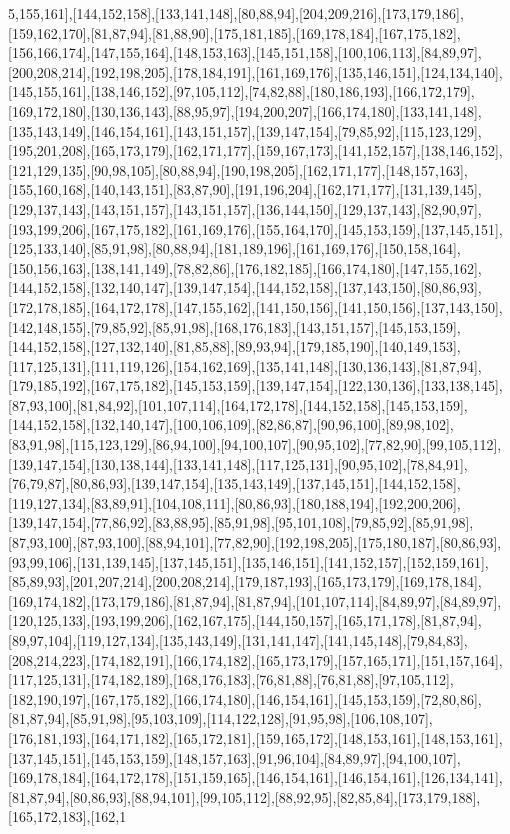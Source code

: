 5,155,161],[144,152,158],[133,141,148],[80,88,94],[204,209,216],[173,179,186],[159,162,170],[81,87,94],[81,88,90],[175,181,185],[169,178,184],[167,175,182],[156,166,174],[147,155,164],[148,153,163],[145,151,158],[100,106,113],[84,89,97],[200,208,214],[192,198,205],[178,184,191],[161,169,176],[135,146,151],[124,134,140],[145,155,161],[138,146,152],[97,105,112],[74,82,88],[180,186,193],[166,172,179],[169,172,180],[130,136,143],[88,95,97],[194,200,207],[166,174,180],[133,141,148],[135,143,149],[146,154,161],[143,151,157],[139,147,154],[79,85,92],[115,123,129],[195,201,208],[165,173,179],[162,171,177],[159,167,173],[141,152,157],[138,146,152],[121,129,135],[90,98,105],[80,88,94],[190,198,205],[162,171,177],[148,157,163],[155,160,168],[140,143,151],[83,87,90],[191,196,204],[162,171,177],[131,139,145],[129,137,143],[143,151,157],[143,151,157],[136,144,150],[129,137,143],[82,90,97],[193,199,206],[167,175,182],[161,169,176],[155,164,170],[145,153,159],[137,145,151],[125,133,140],[85,91,98],[80,88,94],[181,189,196],[161,169,176],[150,158,164],[150,156,163],[138,141,149],[78,82,86],[176,182,185],[166,174,180],[147,155,162],[144,152,158],[132,140,147],[139,147,154],[144,152,158],[137,143,150],[80,86,93],[172,178,185],[164,172,178],[147,155,162],[141,150,156],[141,150,156],[137,143,150],[142,148,155],[79,85,92],[85,91,98],[168,176,183],[143,151,157],[145,153,159],[144,152,158],[127,132,140],[81,85,88],[89,93,94],[179,185,190],[140,149,153],[117,125,131],[111,119,126],[154,162,169],[135,141,148],[130,136,143],[81,87,94],[179,185,192],[167,175,182],[145,153,159],[139,147,154],[122,130,136],[133,138,145],[87,93,100],[81,84,92],[101,107,114],[164,172,178],[144,152,158],[145,153,159],[144,152,158],[132,140,147],[100,106,109],[82,86,87],[90,96,100],[89,98,102],[83,91,98],[115,123,129],[86,94,100],[94,100,107],[90,95,102],[77,82,90],[99,105,112],[139,147,154],[130,138,144],[133,141,148],[117,125,131],[90,95,102],[78,84,91],[76,79,87],[80,86,93],[139,147,154],[135,143,149],[137,145,151],[144,152,158],[119,127,134],[83,89,91],[104,108,111],[80,86,93],[180,188,194],[192,200,206],[139,147,154],[77,86,92],[83,88,95],[85,91,98],[95,101,108],[79,85,92],[85,91,98],[87,93,100],[87,93,100],[88,94,101],[77,82,90],[192,198,205],[175,180,187],[80,86,93],[93,99,106],[131,139,145],[137,145,151],[135,146,151],[141,152,157],[152,159,161],[85,89,93],[201,207,214],[200,208,214],[179,187,193],[165,173,179],[169,178,184],[169,174,182],[173,179,186],[81,87,94],[81,87,94],[101,107,114],[84,89,97],[84,89,97],[120,125,133],[193,199,206],[162,167,175],[144,150,157],[165,171,178],[81,87,94],[89,97,104],[119,127,134],[135,143,149],[131,141,147],[141,145,148],[79,84,83],[208,214,223],[174,182,191],[166,174,182],[165,173,179],[157,165,171],[151,157,164],[117,125,131],[174,182,189],[168,176,183],[76,81,88],[76,81,88],[97,105,112],[182,190,197],[167,175,182],[166,174,180],[146,154,161],[145,153,159],[72,80,86],[81,87,94],[85,91,98],[95,103,109],[114,122,128],[91,95,98],[106,108,107],[176,181,193],[164,171,182],[165,172,181],[159,165,172],[148,153,161],[148,153,161],[137,145,151],[145,153,159],[148,157,163],[91,96,104],[84,89,97],[94,100,107],[169,178,184],[164,172,178],[151,159,165],[146,154,161],[146,154,161],[126,134,141],[81,87,94],[80,86,93],[88,94,101],[99,105,112],[88,92,95],[82,85,84],[173,179,188],[165,172,183],[162,1